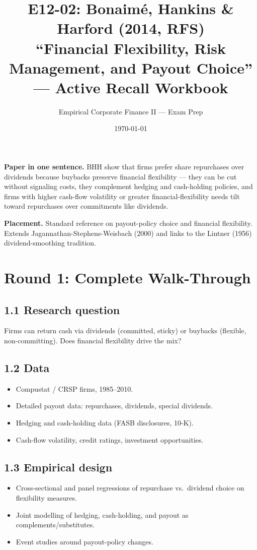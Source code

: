 \documentclass[11pt]{article}
\title{E12-02: Bonaim\'e, Hankins \& Harford (2014, RFS) \\
\large ``Financial Flexibility, Risk Management, and Payout Choice'' --- Active Recall Workbook}
\author{Empirical Corporate Finance II --- Exam Prep}
\date{\today}
\begin{document}
\maketitle

\begin{keybox}
\textbf{Paper in one sentence.} BHH show that firms prefer share repurchases over dividends because buybacks preserve financial flexibility --- they can be cut without signaling costs, they complement hedging and cash-holding policies, and firms with higher cash-flow volatility or greater financial-flexibility needs tilt toward repurchases over commitments like dividends.

\textbf{Placement.} Standard reference on payout-policy choice and financial flexibility. Extends Jagannathan-Stephens-Weisbach (2000) and links to the Lintner (1956) dividend-smoothing tradition.
\end{keybox}

\section*{Round 1: Complete Walk-Through}

\subsection*{1.1 Research question}
Firms can return cash via dividends (committed, sticky) or buybacks (flexible, non-committing). Does financial flexibility drive the mix?

\subsection*{1.2 Data}
\begin{itemize}
\item Compustat / CRSP firms, 1985--2010.
\item Detailed payout data: repurchases, dividends, special dividends.
\item Hedging and cash-holding data (FASB disclosures, 10-K).
\item Cash-flow volatility, credit ratings, investment opportunities.
\end{itemize}

\subsection*{1.3 Empirical design}
\begin{itemize}
\item Cross-sectional and panel regressions of repurchase vs.\ dividend choice on flexibility measures.
\item Joint modelling of hedging, cash-holding, and payout as complements/substitutes.
\item Event studies around payout-policy changes.
\end{itemize}
\end{document}
